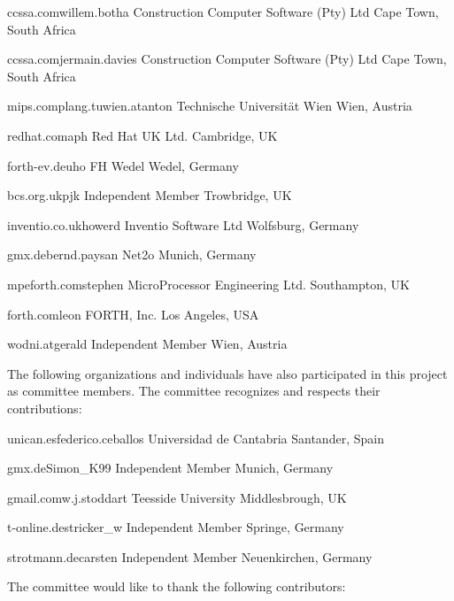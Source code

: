 	{ccssa.com}{willem.botha}
	{Construction Computer Software (Pty) Ltd}
	{Cape Town, South Africa}

	{ccssa.com}{jermain.davies}
	{Construction Computer Software (Pty) Ltd}
	{Cape Town, South Africa}

	{mips.complang.tuwien.at}{anton}
	{Technische Universit\"at Wien}
	{Wien, Austria}

	{redhat.com}{aph}
	{Red Hat UK Ltd.}
	{Cambridge, UK}

	{forth-ev.de}{uho}
	{FH Wedel}
	{Wedel, Germany}

	{bcs.org.uk}{pjk}
	{Independent Member}
	{Trowbridge, UK}

	{inventio.co.uk}{howerd}
	{Inventio Software Ltd}
	{Wolfsburg, Germany}

	{gmx.de}{bernd.paysan}
	{Net2o}
	{Munich, Germany}

	{mpeforth.com}{stephen}
	{MicroProcessor Engineering Ltd.}
	{Southampton, UK}

	{forth.com}{leon}
	{FORTH, Inc.}
	{Los Angeles, USA}

	{wodni.at}{gerald}
	{Independent Member}
	{Wien, Austria}

The following organizations and individuals have also participated in
this project as committee members. The committee recognizes and
respects their contributions:

	{unican.es}{federico.ceballos}
	{Universidad de Cantabria}
	{Santander, Spain}

	{gmx.de}{Simon\_K99}
	{Independent Member}
	{Munich, Germany}

	{gmail.com}{w.j.stoddart}
	{Teesside University}
	{Middlesbrough, UK}

	{t-online.de}{stricker\_w}
	{Independent Member}
	{Springe, Germany}

	{strotmann.de}{carsten}
	{Independent Member}
	{Neuenkirchen, Germany}

The committee would like to thank the following contributors:


